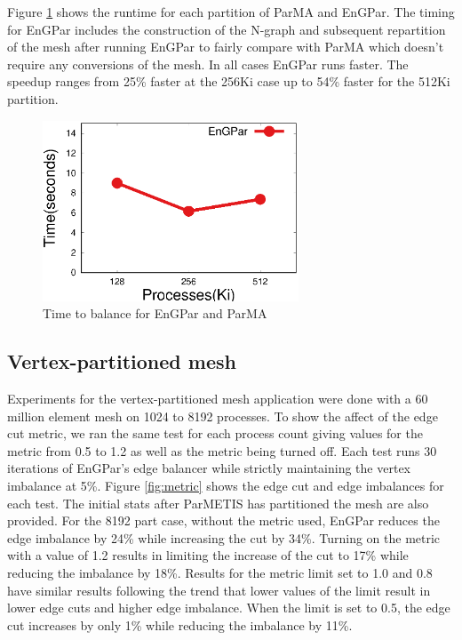 \documentclass[conference]{IEEEtran}
\begin{document}
Figure \ref{fig:fem_time} shows the runtime for each partition of ParMA and EnGPar. The
timing for EnGPar includes the construction of the N-graph and subsequent repartition of
the mesh after running EnGPar to fairly compare with ParMA which doesn't require any
conversions of the mesh. In all cases EnGPar runs faster. The speedup ranges from
25\% faster at the 256Ki case up to 54\% faster for the 512Ki partition.

\begin{figure}[!ht]
  \centering
  \includegraphics[width=3in]{plots/mira_fem_results/time_v_cores}
  \caption{Time to balance for EnGPar and ParMA}
  \label{fig:fem_time}
\end{figure}

\subsection {Vertex-partitioned mesh}
Experiments for the vertex-partitioned mesh application were done with a 60 million
element mesh on 1024 to 8192 processes. To show the affect of the edge cut
metric, we ran the same test for each process count giving values for the metric
from 0.5 to 1.2 as well as the metric being turned off. Each test runs 30 iterations
of EnGPar's edge balancer while strictly maintaining the vertex imbalance at 5\%.
Figure \ref{fig:metric} shows the edge cut and edge imbalances for each
test. The initial stats after ParMETIS has partitioned the mesh are also provided. For the
8192 part case, without
the metric used, EnGPar reduces the edge imbalance by 24\% while increasing the cut by
34\%. Turning on the metric with a value of 1.2 results in limiting the increase of the cut to
17\% while reducing the imbalance by 18\%. Results for the metric limit set to 1.0
and 0.8 have similar results following the trend that lower values of the limit result
in lower edge cuts and higher edge imbalance. When the limit is set to 0.5, the edge cut
increases by only 1\% while reducing the imbalance by 11\%.
\end{document}
